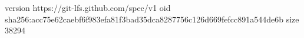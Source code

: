 version https://git-lfs.github.com/spec/v1
oid sha256:acc75e62caebf6f983efa81f3bad35dca8287756c126d669fefcc891a544de6b
size 38294
